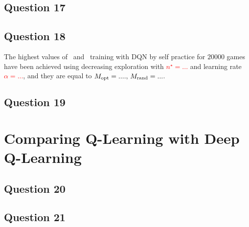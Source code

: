 \documentclass[10pt]{IEEEtran}
\begin{document}
\subsection*{Question 17}
\subsection*{Question 18}
The highest values of \mopt\  and \mrand\  training with DQN by self practice for $20000$ games have been achieved using decreasing exploration with \textcolor{red}{$n^{\star} = ...$} and learning rate \textcolor{red}{$\alpha = ...$}, and they are equal to \textcolor{red}{$M_{\text{opt}} = ...., \, M_{\text{rand}} = ...$}.

\subsection*{Question 19}

\section{Comparing Q-Learning with Deep Q-Learning}
\subsection*{Question 20}
\subsection*{Question 21}

\nocite{*}
\printbibliography

\clearpage
{}
\end{document}
